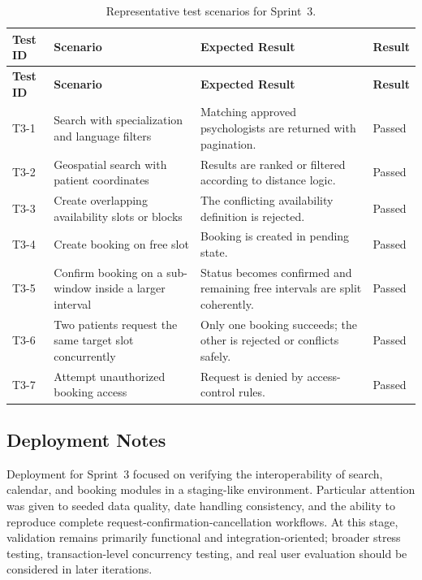 \documentclass[a4paper,12pt]{report}
\begin{document}
\begin{longtable}{@{} L{0.12\textwidth} L{0.46\textwidth} L{0.24\textwidth} C{0.12\textwidth} @{}}
\caption{Representative test scenarios for Sprint~3.}
\label{tab:sprint3-tests}\\
\toprule
\textbf{Test ID} &
\textbf{Scenario} &
\textbf{Expected Result} &
\textbf{Result} \\
\midrule
\endfirsthead

\toprule
\textbf{Test ID} &
\textbf{Scenario} &
\textbf{Expected Result} &
\textbf{Result} \\
\midrule
\endhead

T3-1 & Search with specialization and language filters & Matching approved psychologists are returned with pagination. & \textcolor{successgreen}{Passed} \\
\midrule
T3-2 & Geospatial search with patient coordinates & Results are ranked or filtered according to distance logic. & \textcolor{successgreen}{Passed} \\
\midrule
T3-3 & Create overlapping availability slots or blocks & The conflicting availability definition is rejected. & \textcolor{successgreen}{Passed} \\
\midrule
T3-4 & Create booking on free slot & Booking is created in pending state. & \textcolor{successgreen}{Passed} \\
\midrule
T3-5 & Confirm booking on a sub-window inside a larger interval & Status becomes confirmed and remaining free intervals are split coherently. & \textcolor{successgreen}{Passed} \\
\midrule
T3-6 & Two patients request the same target slot concurrently & Only one booking succeeds; the other is rejected or conflicts safely. & \textcolor{successgreen}{Passed} \\
\midrule
T3-7 & Attempt unauthorized booking access & Request is denied by access-control rules. & \textcolor{successgreen}{Passed} \\

\bottomrule
\end{longtable}

\subsection{Deployment Notes}

Deployment for Sprint~3 focused on verifying the interoperability of search, calendar, and booking modules in a staging-like environment. Particular attention was given to seeded data quality, date handling consistency, and the ability to reproduce complete request-confirmation-cancellation workflows. At this stage, validation remains primarily functional and integration-oriented; broader stress testing, transaction-level concurrency testing, and real user evaluation should be considered in later iterations.
\end{document}
